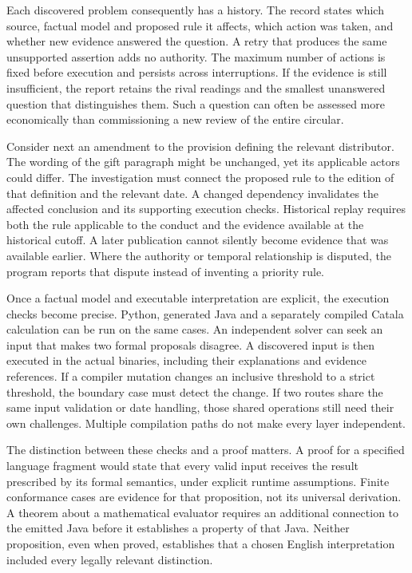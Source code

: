 \documentclass[12pt,a4paper,oneside,openany]{book}
\begin{document}
Each discovered problem consequently has a history. The record states which
source, factual model and proposed rule it affects, which action was taken,
and whether new evidence answered the question. A retry that produces the same
unsupported assertion adds no authority. The maximum number of actions is fixed
before execution and persists across interruptions. If the evidence is still
insufficient, the report retains the rival readings and the smallest unanswered
question that distinguishes them. Such a question can often be assessed more
economically than commissioning a new review of the entire circular.

Consider next an amendment to the provision defining the relevant distributor.
The wording of the gift paragraph might be unchanged, yet its applicable actors
could differ. The investigation must connect the proposed rule to the edition
of that definition and the relevant date. A changed dependency invalidates the
affected conclusion and its supporting execution checks. Historical replay
requires both the rule applicable to the conduct and the evidence available at
the historical cutoff. A later publication cannot silently become evidence that
was available earlier. Where the authority or temporal relationship is disputed,
the program reports that dispute instead of inventing a priority rule.

Once a factual model and executable interpretation are explicit, the execution
checks become precise. Python, generated Java and a separately compiled Catala
calculation can be run on the same cases. An independent solver can seek an
input that makes two formal proposals disagree. A discovered input is then
executed in the actual binaries, including their explanations and evidence
references. If a compiler mutation changes an inclusive threshold to a strict
threshold, the boundary case must detect the change. If two routes share the
same input validation or date handling, those shared operations still need
their own challenges. Multiple compilation paths do not make every layer
independent.

The distinction between these checks and a proof matters. A proof for a
specified language fragment would state that every valid input receives the
result prescribed by its formal semantics, under explicit runtime assumptions.
Finite conformance cases are evidence for that proposition, not its universal
derivation. A theorem about a mathematical evaluator requires an additional
connection to the emitted Java before it establishes a property of that Java.
Neither proposition, even when proved, establishes that a chosen English
interpretation included every legally relevant distinction.
\end{document}
